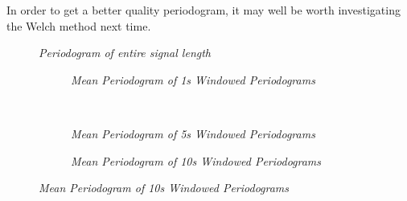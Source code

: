 \documentclass[./main.tex]{subfiles}
\begin{document}
In order to get a better quality periodogram, it may well be worth investigating the Welch method next time.

\begin{figure}[h]
	\centering
	\resizebox{\textwidth}{!}{}
	\caption{\textit{Periodogram of entire signal length}}
	\label{fig:1_4_b_org}
\end{figure}

\begin{figure}[h]
	\centering
	\begin{subfigure}[b]{0.49\textwidth}
		\resizebox{\textwidth}{!}{}
		\caption{\textit{Mean Periodogram of 1s Windowed Periodograms}}
		\label{fig:1_4_b_1s}
	\end{subfigure}
	~ %
	\begin{subfigure}[b]{0.49\textwidth}
		\resizebox{\textwidth}{!}{}
		\caption{\textit{Mean Periodogram of 5s Windowed Periodograms}}
		\label{fig:1_4_b_5s}
	\end{subfigure}
	
	\begin{subfigure}[b]{0.49\textwidth}
		\resizebox{\textwidth}{!}{}
		\caption{\textit{Mean Periodogram of 10s Windowed Periodograms}}
		\label{fig:1_4_b_10s}
	\end{subfigure}
	
\end{figure}
\end{document}
